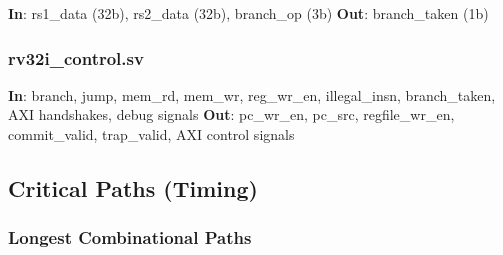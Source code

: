 \begin{record}

\textbf{In}: rs1\_data (32b), rs2\_data (32b), branch\_op (3b)
\textbf{Out}: branch\_\allowbreak{}taken (1b)

\end{record}

\subsubsection{\texorpdfstring{rv32i\_\allowbreak{}control.sv}{rv32i\_control.sv}}\label{cr:fix:cpu-dataflow-diagram:rv32i-controlsv}

\begin{record}

\textbf{In}: branch, jump, mem\_rd, mem\_wr,
reg\_\allowbreak{}wr\_\allowbreak{}en, illegal\_\allowbreak{}insn,
branch\_\allowbreak{}taken, AXI handshakes, debug signals \textbf{Out}:
pc\_wr\_en, pc\_src, regfile\_\allowbreak{}wr\_\allowbreak{}en,
commit\_\allowbreak{}valid, trap\_\allowbreak{}valid, AXI control
signals

\end{record}

\subsection{Critical Paths (Timing)}\label{cr:fix:cpu-dataflow-diagram:critical-paths-timing}

\subsubsection{Longest Combinational Paths}\label{cr:fix:cpu-dataflow-diagram:longest-combinational-paths}

